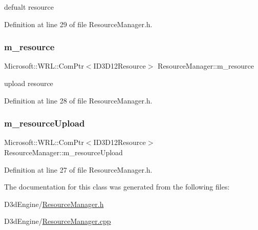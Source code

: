 defualt resource 



Definition at line 29 of file Resource\+Manager.\+h.

\mbox{\label{class_resource_manager_a2190eea97044904955f1fead12732be5}} 
\subsubsection{\texorpdfstring{m\+\_\+resource}{m\_resource}}
{\footnotesize\ttfamily Microsoft\+::\+W\+R\+L\+::\+Com\+Ptr$<$I\+D3\+D12\+Resource$>$ Resource\+Manager\+::m\+\_\+resource\hspace{0.3cm}{\ttfamily [private]}}



upload resource 



Definition at line 28 of file Resource\+Manager.\+h.

\mbox{\label{class_resource_manager_a5d2576312216c2e85631636f3e76c3b2}} 
\subsubsection{\texorpdfstring{m\+\_\+resource\+Upload}{m\_resourceUpload}}
{\footnotesize\ttfamily Microsoft\+::\+W\+R\+L\+::\+Com\+Ptr$<$I\+D3\+D12\+Resource$>$ Resource\+Manager\+::m\+\_\+resource\+Upload\hspace{0.3cm}{\ttfamily [private]}}



Definition at line 27 of file Resource\+Manager.\+h.



The documentation for this class was generated from the following files\+:\begin{DoxyCompactItemize}
\item 
D3d\+Engine/\mbox{\hyperlink{_resource_manager_8h}{Resource\+Manager.\+h}}\item 
D3d\+Engine/\mbox{\hyperlink{_resource_manager_8cpp}{Resource\+Manager.\+cpp}}\end{DoxyCompactItemize}
